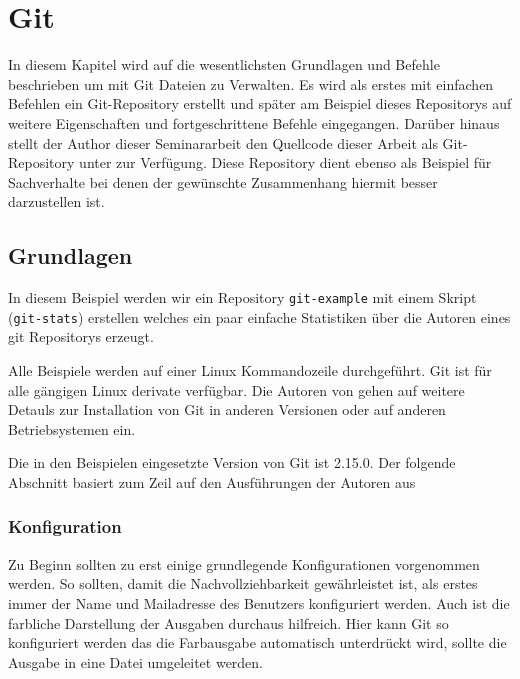 \chapter{Git}\label{cha:Git}
In diesem Kapitel wird auf die wesentlichsten Grundlagen und Befehle
beschrieben um mit Git Dateien zu Verwalten. Es wird als erstes mit einfachen
Befehlen ein Git-Repository erstellt und später am Beispiel dieses Repositorys
auf weitere Eigenschaften und fortgeschrittene Befehle eingegangen. Darüber
hinaus stellt der Author dieser Seminararbeit den Quellcode dieser Arbeit als
Git-Repository unter \cite{link:seminararbeit} zur Verfügung. Diese Repository
dient ebenso als Beispiel für Sachverhalte bei denen der gewünschte
Zusammenhang hiermit besser darzustellen ist.

\section{Grundlagen}\label{gitbasics}
In diesem Beispiel werden wir ein Repository \texttt{git-example} mit einem
Skript (\texttt{git-stats}) erstellen welches ein paar einfache Statistiken
über die Autoren eines git Repositorys erzeugt.

Alle Beispiele werden auf einer Linux Kommandozeile durchgeführt. Git ist für
alle gängigen Linux derivate verfügbar. Die Autoren von \cite[S.~12-14]{gitpro}
gehen auf weitere Detauls zur Installation von Git in anderen Versionen oder
auf anderen Betriebsystemen ein.

Die in den Beispielen eingesetzte Version von Git ist 2.15.0. Der folgende
Abschnitt basiert zum Zeil auf den Ausführungen der Autoren aus
\cite[S.22-57]{gitops}



\subsection{Konfiguration}\label{gitconfig}
Zu Beginn sollten zu erst einige grundlegende Konfigurationen vorgenommen
werden. So sollten, damit die Nachvollziehbarkeit gewährleistet ist, als erstes
immer der Name und Mailadresse des Benutzers konfiguriert werden. Auch ist die
farbliche Darstellung der Ausgaben durchaus hilfreich. Hier kann Git so
konfiguriert werden das die Farbausgabe automatisch unterdrückt wird, sollte
die Ausgabe in eine Datei umgeleitet werden.



